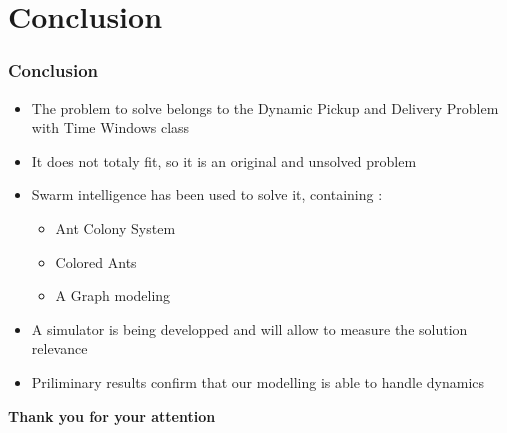 \documentclass{beamer}
\begin{document}
\section{Conclusion}
\begin{frame}
 \frametitle{Conclusion}
	\begin{itemize}
	 \item The problem to solve belongs to the Dynamic Pickup and Delivery Problem with Time Windows class
	 \item It does not totaly fit, so it is an original and unsolved problem
	 \item Swarm intelligence has been used to solve it, containing :
	 \begin{itemize}
		\item Ant Colony System
		\item Colored Ants
		\item A Graph modeling
	\end{itemize}
	 \item A simulator is being developped and will allow to measure the solution relevance
	 \item Priliminary results confirm that our modelling is able to handle dynamics
	\end{itemize}

	\pause
	\begin{center}
		\textbf{Thank you for your attention}
	\end{center}

\end{frame}
\tiny


% 
% 
\end{document}
